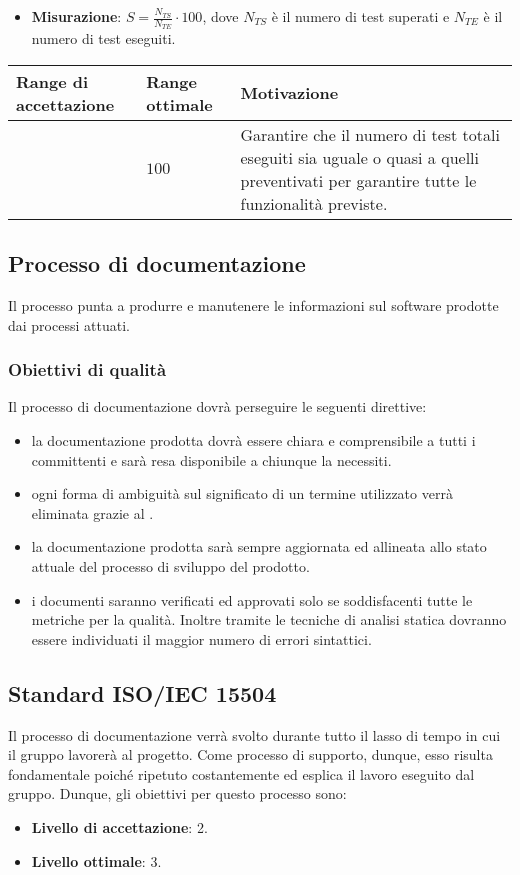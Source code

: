 \begin{itemize}
\item \textbf{Misurazione}: $S=\frac{N_{TS}}{N_{TE}} \cdot 100$, dove $N_{TS}$ è il numero di test superati e $N_{TE}$ è il numero di test eseguiti.
\end{itemize}

\begin{center}
		\begin{tabular}{|P{2.5cm}|P{2.5cm}|P{6cm}|}
		\hline
			\textbf{Range di accettazione}	& \textbf{Range ottimale} & \textbf{Motivazione} \\
			\hline
			[$90 - 100$] & $100$ &	Garantire che il numero di test totali eseguiti sia uguale o quasi a quelli preventivati per garantire tutte le funzionalità previste. \\
			\hline
			\end{tabular}
\end{center}



\subsection{Processo di documentazione}

Il processo punta a produrre e manutenere le informazioni sul software prodotte dai processi attuati.
\subsubsection{Obiettivi di qualità}
Il processo di documentazione dovrà perseguire le seguenti direttive:
\begin{itemize}
\item la documentazione prodotta dovrà essere chiara e comprensibile a tutti i committenti e sarà resa disponibile a chiunque la necessiti.
\item ogni forma di ambiguità sul significato di un termine utilizzato verrà eliminata grazie al \glossario.
\item la documentazione prodotta sarà sempre aggiornata ed allineata allo stato attuale del processo di sviluppo del prodotto.
\item i documenti saranno verificati ed approvati solo se soddisfacenti tutte le metriche per la qualità. Inoltre tramite le tecniche di analisi statica dovranno essere individuati il maggior numero di errori sintattici.
\end{itemize}

\subsection{Standard ISO/IEC 15504}
Il processo di documentazione verrà svolto durante tutto il lasso di tempo in cui il gruppo lavorerà al progetto. Come processo di supporto, dunque, esso risulta fondamentale poiché ripetuto costantemente ed esplica il lavoro eseguito dal gruppo. Dunque, gli obiettivi per questo processo sono:
\begin{itemize}
\item \textbf{Livello di accettazione}: 2.
\item \textbf{Livello ottimale}: 3.
\end{itemize}


